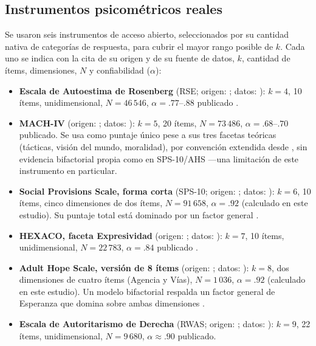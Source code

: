 \documentclass[man,mask,donotrepeattitle,floatsintext]{apa7}
\begin{document}
\subsection{Instrumentos psicométricos reales}
\label{sec:instruments}

Se usaron seis instrumentos de acceso abierto, seleccionados por su cantidad nativa de categorías de respuesta, para cubrir el mayor rango posible de $k$. Cada uno se indica con la cita de su origen y de su fuente de datos, $k$, cantidad de ítems, dimensiones, $N$ y confiabilidad ($\alpha$):

\begin{itemize}
\item \textbf{Escala de Autoestima de Rosenberg} (RSE; origen: \cite{rosenberg1965}; datos: \cite{osp2014rse}): $k=4$, 10 ítems, unidimensional, $N=46\,546$, $\alpha=.77$--$.88$ publicado \parencite{blascovichtomaka1993,rosenberg1986}.
\item \textbf{MACH-IV} (origen: \cite{christiegeis1970}; datos: \cite{osp2019mach}): $k=5$, 20 ítems, $N=73\,486$, $\alpha=.68$--$.70$ publicado. Se usa como puntaje único pese a sus tres facetas teóricas (tácticas, visión del mundo, moralidad), por convención extendida desde \citeauthor{christiegeis1970}, sin evidencia bifactorial propia como en SPS-10/AHS —una limitación de este instrumento en particular.
\item \textbf{Social Provisions Scale, forma corta} (SPS-10; origen: \cite{cutronarussell1987}; datos: \cite{yamada2021}): $k=6$, 10 ítems, cinco dimensiones de dos ítems, $N=91\,658$, $\alpha=.92$ (calculado en este estudio). Su puntaje total está dominado por un factor general \parencite{sischka2025}.
\item \textbf{HEXACO, faceta Expresividad} (origen: \cite{ashtonleegoldberg2007}; datos: \cite{osp2014hexaco}): $k=7$, 10 ítems, unidimensional, $N=22\,783$, $\alpha=.84$ publicado \parencite{ashtonleegoldberg2007}.
\item \textbf{Adult Hope Scale, versión de 8 ítems} (origen: \cite{snyder1991}; datos: \cite{davis2021}): $k=8$, dos dimensiones de cuatro ítems (Agencia y Vías), $N=1\,036$, $\alpha=.92$ (calculado en este estudio). Un modelo bifactorial respalda un factor general de Esperanza que domina sobre ambas dimensiones \parencite{gomez2014}.
\item \textbf{Escala de Autoritarismo de Derecha} (RWAS; origen: \cite{altemeyer1981}; datos: \cite{osp2016rwas}): $k=9$, 22 ítems, unidimensional, $N=9\,680$, $\alpha \approx .90$ publicado.
\end{itemize}
\end{document}

